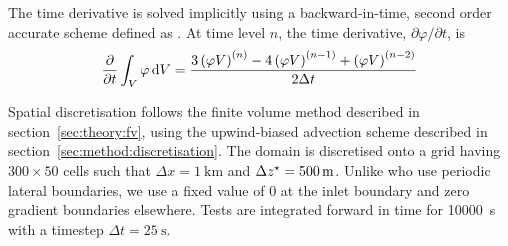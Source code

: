 The time derivative is solved implicitly using a backward-in-time, second order accurate scheme defined as \autocite{openfoam-progguide}.  At time level $n$, the time derivative, $\partial \varphi / \partial t$, is
\begin{align}
	\frac{\partial}{\partial t} \int_V \varphi \mathop{}\!\mathrm{d} V = \frac{
		3 \left( \varphi V \right)^{(n)} - 
		4 \left( \varphi V \right)^{(n-1)} + 
		\left( \varphi V \right)^{(n-2)}
	}{2 \Delta t}
\end{align}

Spatial discretisation follows the finite volume method described in section~\ref{sec:theory:fv}, using the upwind-biased advection scheme described in section~\ref{sec:method:discretisation}.
The domain is discretised onto a grid having $300 \times 50$ cells such that $\Delta x = \SI{1}{\kilo\meter}$ and $\Delta {z^\star} = \SI{500}{\meter}$.  Unlike \textcite{schaer2002} who use periodic lateral boundaries, we use a fixed value of 0 at the inlet boundary and zero gradient boundaries elsewhere.
Tests are integrated forward in time for \SI{10000}{\second} with a timestep $\Delta t = \SI{25}{\second}$.

